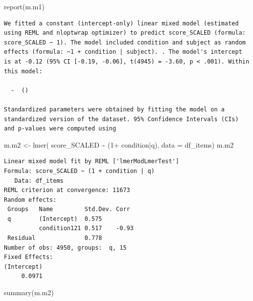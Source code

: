 \documentclass[
  letterpaper,
  DIV=11,
  numbers=noendperiod]{scrreprt}
\newenvironment{Shaded}{\begin{snugshade}}{\end{snugshade}}
\newcommand{\AttributeTok}[1]{\textcolor[rgb]{0.40,0.45,0.13}{#1}}
\newcommand{\DecValTok}[1]{\textcolor[rgb]{0.68,0.00,0.00}{#1}}
\newcommand{\FunctionTok}[1]{\textcolor[rgb]{0.28,0.35,0.67}{#1}}
\newcommand{\NormalTok}[1]{\textcolor[rgb]{0.00,0.23,0.31}{#1}}
\newcommand{\OtherTok}[1]{\textcolor[rgb]{0.00,0.23,0.31}{#1}}
\newcommand{\SpecialCharTok}[1]{\textcolor[rgb]{0.37,0.37,0.37}{#1}}
\begin{document}
\begin{Shaded}
\begin{Highlighting}[]
\FunctionTok{report}\NormalTok{(m.m1)}
\end{Highlighting}
\end{Shaded}

\begin{verbatim}
We fitted a constant (intercept-only) linear mixed model (estimated using REML and nloptwrap optimizer) to predict score_SCALED (formula: score_SCALED ~ 1). The model included condition and subject as random effects (formula: ~1 + condition | subject). . The model's intercept is at -0.12 (95% CI [-0.19, -0.06], t(4945) = -3.60, p < .001). Within this model:

  -  ()

Standardized parameters were obtained by fitting the model on a standardized version of the dataset. 95% Confidence Intervals (CIs) and p-values were computed using 
\end{verbatim}

\begin{Shaded}
\begin{Highlighting}[]
\NormalTok{m.m2 }\OtherTok{\textless{}{-}} \FunctionTok{lmer}\NormalTok{( score\_SCALED }\SpecialCharTok{\textasciitilde{}}\NormalTok{ (}\DecValTok{1}\SpecialCharTok{+}\NormalTok{ condition}\SpecialCharTok{|}\NormalTok{q), }\AttributeTok{data =}\NormalTok{ df\_items)}
\NormalTok{m.m2}
\end{Highlighting}
\end{Shaded}

\begin{verbatim}
Linear mixed model fit by REML ['lmerModLmerTest']
Formula: score_SCALED ~ (1 + condition | q)
   Data: df_items
REML criterion at convergence: 11673
Random effects:
 Groups   Name         Std.Dev. Corr 
 q        (Intercept)  0.575         
          condition121 0.517    -0.93
 Residual              0.778         
Number of obs: 4950, groups:  q, 15
Fixed Effects:
(Intercept)  
     0.0971  
\end{verbatim}

\begin{Shaded}
\begin{Highlighting}[]
\FunctionTok{summary}\NormalTok{(m.m2)}
\end{Highlighting}
\end{Shaded}
\end{document}
